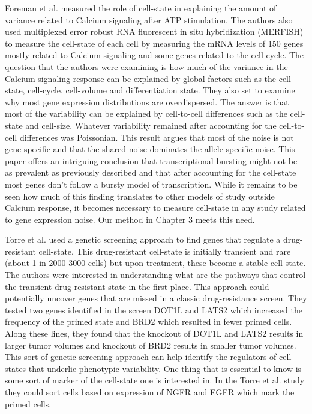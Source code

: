 Foreman et al. \cite{Foreman} measured the role of cell-state in explaining the amount of variance related to Calcium signaling after ATP stimulation. The authors also used multiplexed error robust RNA fluorescent in situ hybridization (MERFISH) to measure the cell-state of each cell by measuring the mRNA levels of 150 genes mostly related to Calcium signaling and some genes related to the cell cycle. The question that the authors were examining is how much of the variance in the Calcium signaling response can be explained by global factors such as the cell-state, cell-cycle, cell-volume and differentiation state. They also set to examine why most gene expression distributions are overdispersed. The answer is that most of the variability can be explained by cell-to-cell differences such as the cell-state and cell-size. Whatever variability remained after accounting for the cell-to-cell differences was Poissonian. This result argues that most of the noise is not gene-specific and that the shared noise dominates the allele-specific noise. This paper offers an intriguing conclusion that transcriptional bursting might not be as prevalent as previously described and that after accounting for the cell-state most genes don't follow a bursty model of transcription. While it remains to be seen how much of this finding translates to other models of study outside Calcium response, it becomes necessary to measure cell-state in any study related to gene expression noise. Our method in Chapter 3 meets this need.

Torre et al. \cite{Torre} used a genetic screening approach to find genes that regulate a drug-resistant cell-state. This drug-resistant cell-state is initially transient and rare (about 1 in 2000-3000 cells) but upon treatment, these become a stable cell-state.  The authors were interested in understanding what are the pathways that control the transient drug resistant state in the first place. This approach could potentially uncover genes that are missed in a classic drug-resistance screen. They tested two genes identified in the screen DOT1L and LATS2 which increased the frequency of the primed state and BRD2 which resulted in fewer primed cells. Along these lines, they found that the knockout of DOT1L and LATS2 results in larger tumor volumes and knockout of BRD2 results in smaller tumor volumes. This sort of genetic-screening approach can help identify the regulators of cell-states that underlie phenotypic variability. One thing that is essential to know is some sort of marker of the cell-state one is interested in. In the Torre et al. study they could sort cells based on expression of NGFR and EGFR which mark the primed cells.

